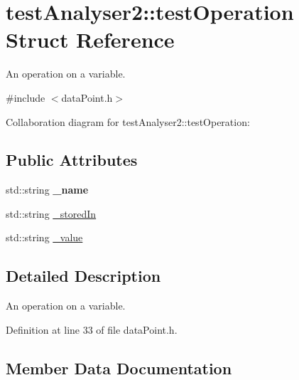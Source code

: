 \hypertarget{structtestAnalyser2_1_1testOperation}{}\section{test\+Analyser2\+::test\+Operation Struct Reference}
\label{structtestAnalyser2_1_1testOperation}


An operation on a variable.  




{\ttfamily \#include $<$data\+Point.\+h$>$}



Collaboration diagram for test\+Analyser2\+::test\+Operation\+:
\subsection*{Public Attributes}
\begin{DoxyCompactItemize}
\item 
\mbox{\label{structtestAnalyser2_1_1testOperation_a8100d41e11ac2fdc52d86384bb635b4b}} 
std\+::string {\bfseries \+\_\+name}
\item 
std\+::string \mbox{\hyperlink{structtestAnalyser2_1_1testOperation_ae274d10ad50bc78b0daca01423b4ff26}{\+\_\+stored\+In}}
\item 
std\+::string \mbox{\hyperlink{structtestAnalyser2_1_1testOperation_af6f6d9a802cb6dffa1440cfb9d88d0f8}{\+\_\+value}}
\end{DoxyCompactItemize}


\subsection{Detailed Description}
An operation on a variable. 

Definition at line 33 of file data\+Point.\+h.



\subsection{Member Data Documentation}
\mbox{\label{structtestAnalyser2_1_1testOperation_ae274d10ad50bc78b0daca01423b4ff26}} 
